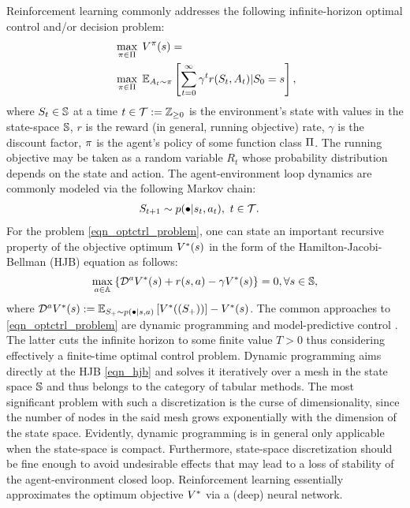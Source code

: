 \documentclass[12pt,twoside]{../../mitthesis}
\begin{document}
Reinforcement learning commonly addresses the following infinite-horizon optimal control and/or decision problem:
\begin{equation}
    \label{eqn_optctrl_problem}
    \begin{aligned}
    & \, \max_{\policy \in \policies} \; \Value^\policy (\state) = \\
    & \, \max_{\policy \in \policies} \; \E[\Action_t \sim \policy]{\sum\limits_{t=0}^{\infty} \gamma^t r(\State_t, \Action_t) \vert \State_0=\state},
    \end{aligned}
\end{equation}
where $\State_t \in \states$ at a time $t \in \T := \Z_{\ge0}$ is the environment's state with values in the state-space $\states$, $r$ is the reward (in general, running objective) rate, $\gamma$ is the discount factor, $\policy$ is the agent's policy of some function class $\policies$.
The running objective may be taken as a random variable $R_t$ whose probability distribution depends on the state and action.
The agent-environment loop dynamics are commonly modeled via the following Markov chain:
\begin{equation}
    \label{eqn_sysmarkov}
    \begin{aligned}
        & \State_{t+1} \sim \transit(\bullet \vert \state_t, \action_t), \spc t \in \T.
    \end{aligned}
\end{equation}
For the problem \eqref{eqn_optctrl_problem}, one can state an important recursive property of the objective optimum $\Value^*(\state)$ in the form of the Hamilton-Jacobi-Bellman (HJB) equation as follows:
\begin{equation}
    \label{eqn_hjb}
    \max_{\action \in \actions}{\{ \mathcal D^\action \Value^*(\state) + r(\state, \action) - \gamma \Value^*(\state)\}} = 0, \forall \state \in \states,
\end{equation}
where $\mathcal D^\action \Value^*(\state) := \E[S_+ \sim \transit(\bullet \vert \state, \action)]{\Value^*((\State_{+}))} - \Value^*(\state)$.
The common approaches to \eqref{eqn_optctrl_problem} are dynamic programming \cite{Bertsekas2019Reinforcementl,Lewis2009Reinforcementl} and model-predictive control \cite{Garcia1989Modelpredictiv,Borrelli2011PredictiveCont,Darby2012MPCCurrentpra,Mayne2014Modelpredictiv}.
The latter cuts the infinite horizon to some finite value $T>0$ thus considering effectively a finite-time optimal control problem.
Dynamic programming aims directly at the HJB \eqref{eqn_hjb} and solves it iteratively over a mesh in the state space $\states$ and thus belongs to the category of tabular methods.
The most significant problem with such a discretization is the curse of dimensionality, since the number of nodes in the said mesh grows exponentially with the dimension of the state space.
Evidently, dynamic programming is in general only applicable when the state-space is compact.
Furthermore, state-space discretization should be fine enough to avoid undesirable effects that may lead to a loss of stability of the agent-environment closed loop.
Reinforcement learning essentially approximates the optimum objective $\Value^*$ via a (deep) neural network.
\end{document}
